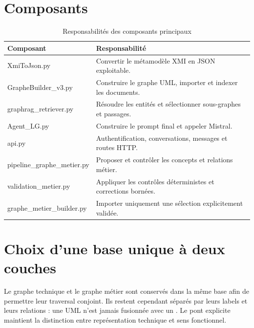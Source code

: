 \section{Composants}

\begin{table}[H]
\centering
\caption{Responsabilités des composants principaux}
\begin{tabularx}{\textwidth}{>{\ttfamily}p{}X}
\toprule
Composant & Responsabilité \\
\midrule
XmiToJson.py & Convertir le métamodèle XMI en JSON exploitable. \\
GrapheBuilder\_v3.py & Construire le graphe UML, importer et indexer les documents. \\
graphrag\_retriever.py & Résoudre les entités et sélectionner sous-graphes et passages. \\
Agent\_LG.py & Construire le prompt final et appeler Mistral. \\
api.py & Authentification, conversations, messages et routes HTTP. \\
pipeline\_graphe\_metier.py & Proposer et contrôler les concepts et relations métier. \\
validation\_metier.py & Appliquer les contrôles déterministes et corrections bornées. \\
graphe\_metier\_builder.py & Importer uniquement une sélection explicitement validée. \\
\bottomrule
\end{tabularx}
\end{table}

\section{Choix d'une base unique à deux couches}

Le graphe technique et le graphe métier sont conservés dans la même base afin de permettre leur traversal conjoint. Ils restent cependant séparés par leurs labels et leurs relations : une  UML n'est jamais fusionnée avec un . Le pont explicite  maintient la distinction entre représentation technique et sens fonctionnel.


